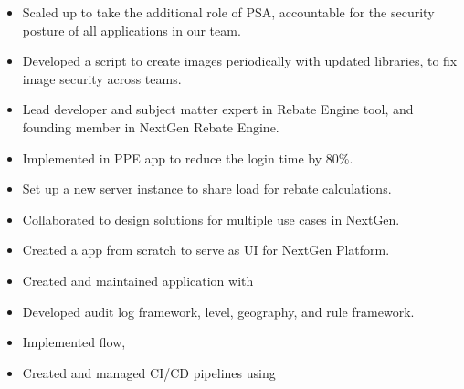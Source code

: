 \documentclass[10pt,a4paper,ragged2e, normalphoto]{altacv}
\begin{document}
\begin{itemize}
  \item Scaled up to take the additional role of PSA, accountable for the security posture of all applications in our team.
  \item Developed a script to create images periodically with updated libraries, to fix image security across teams.
 \end{itemize}
\begin{itemize}
  \item Lead developer and subject matter expert in Rebate Engine tool, and founding member in NextGen Rebate Engine.
  \item Implemented in PPE app to reduce the login time by 80\%.
  \item Set up a new server instance to share load for rebate calculations.
  \item Collaborated to design solutions for multiple use cases in NextGen.
  \item Created a app from scratch to serve as UI for NextGen Platform.
 \end{itemize}
\begin{itemize}
	\item Created and maintained application with 
	\item Developed audit log framework, level, geography, and rule framework.
	\item Implemented flow, 
	\item Created and managed CI/CD pipelines using 
 \end{itemize}
\end{document}
